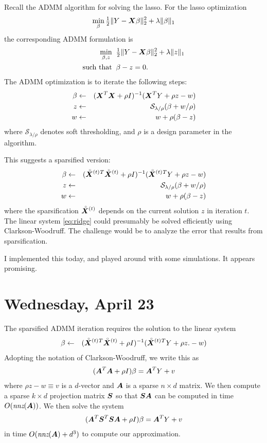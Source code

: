 \documentclass[12pt]{imsart}
\numberwithin{equation}{section}
\theoremstyle{plain}
\theoremstyle{remark}
\def\mbf#1{\mbox{\boldmath$#1$}}
\def\S{S}
\def\X{\mbf{X}}
\def\A{\mbf{A}}
\def\S{\mbf{S}}
\def\Xs#1{\accentset{\;\circ}{\mbf{X}}^{(#1)}}
\def\half{{\textstyle\frac{1}{2}}}
\begin{document}
Recall the ADMM algorithm for solving the lasso.  For the lasso
optimization
\begin{align}
\min_\beta \half \|Y - \X\beta\|_2^2 + \lambda\|\beta\|_1
\end{align}
the corresponding ADMM formulation is
\begin{align}
\min_{\beta,z} & \;\; \half \|Y - \X\beta\|_2^2 + \lambda\|z\|_1 \\
\text{such that} & \;\; \beta-z=0.
\end{align}
The ADMM optimization is to iterate the following steps:
\begin{eqnarray}
\beta &\gets& (\X^T \X + \rho I)^{-1} (\X^T Y + \rho z - w) \\
z &\gets& \mathcal{S}_{\lambda/\rho} (\beta + w/\rho)\\
w &\gets& w + \rho (\beta-z)
\end{eqnarray}
where $\mathcal{S}_{\lambda/\rho}$ denotes soft thresholding, 
and $\rho$ is a design parameter in the algorithm.

This suggests a sparsified version:
\begin{eqnarray}
\beta &\gets& (\Xs{t}{}^T \Xs{t} + \rho I)^{-1} (\Xs{t}{}^T Y + \rho z
- w)  \label{eq:ridge}\\
z &\gets& \mathcal{S}_{\lambda/\rho} (\beta + w/\rho)\\
w &\gets& w + \rho (\beta-z)
\end{eqnarray}
where the sparsification $\Xs{t}$ depends on the 
current solution $z$ in iteration $t$.  The linear system \eqref{eq:ridge}
could presumably be solved efficiently using Clarkson-Woodruff.  The
challenge would be to analyze the error that results from sparsification.

I implemented this today, and played around with some simulations.  It
appears promising.

\section*{Wednesday, April 23}

The sparsified ADMM iteration requires the solution to the linear system
\begin{eqnarray}
\beta &\gets& (\Xs{t}{}^T \Xs{t} + \rho I)^{-1} (\Xs{t}{}^T Y + \rho z.
- w)  \label{eq:ridge}
\end{eqnarray}
Adopting the notation of Clarkson-Woodruff, we write this as
\begin{eqnarray}
(\A^T \A + \rho I)\beta = \A^T Y + v
\end{eqnarray}
where $\rho z - w \equiv v$ is a $d$-vector and $\A$ 
is a sparse $n\times d$ matrix. We then compute a sparse
$k\times d$ projection matrix $\S$ so that $\S\A$ can
be computed in time $O(\textit{nnz}(\mbf{A}))$.
We then solve the system
\begin{eqnarray}
(\A^T\S^T \S\A + \rho I)\beta = \A^T Y + v
\end{eqnarray}
in time $O(\textit{nnz}(\mbf{A}) + d^3)$ to compute our approximation.
\end{document}
